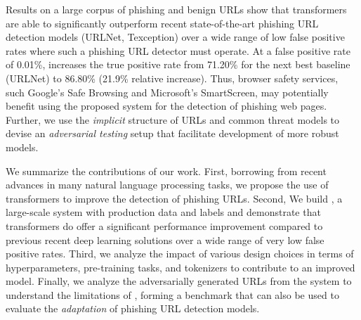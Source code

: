 Results on a large corpus of phishing and benign URLs show that transformers are able to significantly outperform recent state-of-the-art phishing URL detection models (URLNet, Texception) over a wide range of low false positive rates where such a phishing URL detector must operate. 
At a false positive rate of 0.01\%, \URLTranSys increases the true positive rate from 71.20\% for the next best baseline (URLNet)
to 86.80\% (21.9\% relative increase). Thus, browser safety services, such Google's Safe Browsing and Microsoft's SmartScreen, may potentially benefit using the proposed \URLTranSys system for the detection of phishing web pages.
Further, we use the \textit{implicit} structure of URLs and common threat models to devise an \textit{adversarial testing} setup that facilitate development of more robust models.

We summarize the contributions of our work. First, borrowing from recent advances in many natural language processing tasks, we propose the use of transformers to improve the detection of phishing URLs.
Second, We build \URLTranSys, a large-scale system with production data and labels and demonstrate that transformers do offer a significant performance improvement compared to previous recent deep learning solutions over a wide range of very low false positive rates.
Third, we analyze the impact of various design choices in terms of hyperparameters, pre-training tasks, and tokenizers to contribute to an improved model.
Finally, we analyze the adversarially generated URLs from the system to understand the limitations of \URLTranSys, forming a benchmark that can also be used to evaluate the \textit{adaptation} of phishing URL detection models. 

